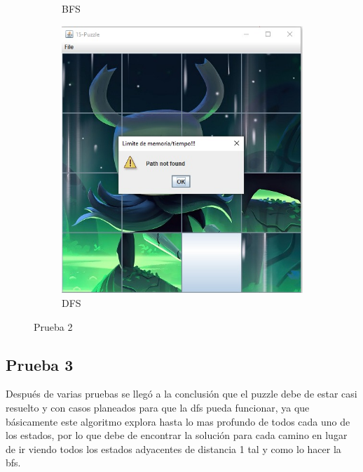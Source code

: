 \begin{figure}[!h]
\begin{subfigure}{0.3\textwidth}
            \caption{BFS}
          \end{subfigure}
          \hfill
          \begin{subfigure}{0.3\textwidth}
            \includegraphics[width=\textwidth]{Imagenes/dfs2.jpg}
            \caption{DFS}
          \end{subfigure}
          \caption{Prueba 2}
        \end{figure}

    \subsection{Prueba 3}
        Después de varias pruebas se llegó a la conclusión que el puzzle debe de estar casi resuelto y con casos planeados para que la dfs pueda funcionar, ya que básicamente este algoritmo explora hasta lo mas profundo de todos cada uno de los estados, por lo que debe de encontrar la solución para cada camino en lugar de ir viendo todos los estados adyacentes de distancia 1 tal y como lo hacer la bfs.
        
